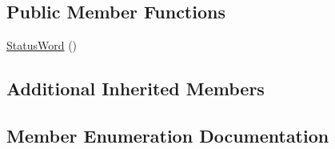 \subsection*{Public Member Functions}
\begin{DoxyCompactItemize}
\item 
\hyperlink{struct_ci_a402_1_1_status_word_a91e826e328dba026fe074dc84fc67aea}{Status\+Word} ()
\end{DoxyCompactItemize}
\subsection*{Additional Inherited Members}


\subsection{Member Enumeration Documentation}
\hypertarget{struct_ci_a402_1_1_status_word_a9f47eab9ccb339144eb9c5848109b3e7}{}
